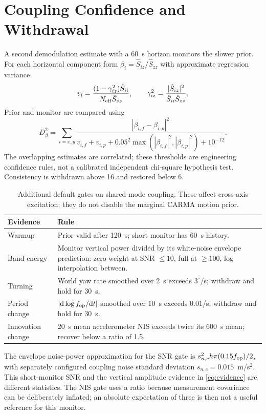 \documentclass[conference]{IEEEtran}
\newcommand{\dd}{\mathrm d}
\begin{document}
\section{Coupling Confidence and Withdrawal}
\label{sec:confidence}
A second demodulation estimate with a 60~s horizon monitors the slower
prior. For each horizontal component form
$\beta_i=\hat S_{iz}/\hat S_{zz}$ with approximate regression variance
\begin{equation}
 v_i=\frac{(1-\gamma_{iz}^2)\hat S_{ii}}{N_{\rm eff}\hat S_{zz}},\qquad
 \gamma_{iz}^2=\frac{|\hat S_{iz}|^2}{\hat S_{ii}\hat S_{zz}}.
 \label{eq:regvar}
\end{equation}
Prior and monitor are compared using
\begin{equation}
 D_\beta^2=\sum_{i=x,y}
 \frac{|\beta_{i,f}-\beta_{i,p}|^2}
 {v_{i,f}+v_{i,p}+0.05^2\max(|\beta_{i,f}|^2,|\beta_{i,p}|^2)+10^{-12}}.
 \label{eq:mismatch}
\end{equation}
The overlapping estimates are correlated; these thresholds are engineering
confidence rules, not a calibrated independent chi-square hypothesis test.
Consistency is withdrawn above 16 and restored below 6.

\begin{table}[!t]
\caption{Additional default gates on shared-mode coupling. These affect
cross-axis excitation; they do not disable the marginal CARMA motion prior.}
\label{tab:gates}\centering\footnotesize
\begin{tabular}{@{}p{}p{}@{}}\toprule
Evidence & Rule\\\midrule
Warmup & Prior valid after 120~s; short monitor has 60~s history.\\
Band energy & Monitor vertical power divided by its white-noise envelope prediction: zero weight at SNR $\le10$, full at $\ge100$, log interpolation between.\\
Turning & World yaw rate smoothed over 2~s exceeds $3^\circ$/s; withdraw and hold for 30~s.\\
Period change & $|\dd\log f_{\rm op}/\dd t|$ smoothed over 10~s exceeds 0.01/s; withdraw and hold for 30~s.\\
Innovation change & 20~s mean accelerometer NIS exceeds twice its 600~s mean; recover below a ratio of 1.5.\\\bottomrule
\end{tabular}
\end{table}

The envelope noise-power approximation for the SNR gate is
$s_{n,c}^2 h\pi(0.15f_{\rm op})/2$, with separately configured coupling
noise standard deviation $s_{n,c}=0.015$~m/s$^2$. This short-monitor SNR
and the vertical amplitude evidence in \cref{eq:evidence} are different
statistics. The NIS gate uses a ratio because measurement covariance can
be deliberately inflated; an absolute expectation of three is then not
a useful reference for this monitor.
\end{document}
